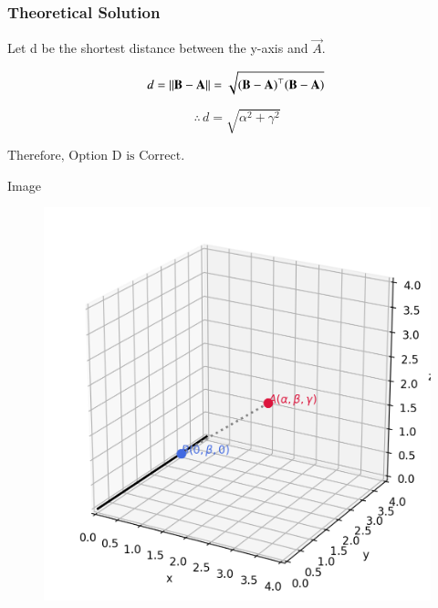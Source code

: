 \documentclass{beamer}
\begin{document}
\begin{frame}[fragile]
    \frametitle{Theoretical Solution}
Let d be the shortest distance between the y-axis and $\vec{A}$.

\begin{equation}
    d = \left\lVert\mathbf{B}-\mathbf{A}\right\rVert = \sqrt{\mathbf{(B-A)}^\top\mathbf{(B-A)}} \,  
\end{equation}

\begin{equation}
\therefore \, d = \sqrt{\alpha^2 + \gamma^2}    
\end{equation}

\begin{center}
$\boxed{\text{Therefore, Option D is Correct.}}$
\end{center}
\end{frame}

\begin{frame}{Image}
\begin{figure}
   \centering
    \includegraphics[width=\columnwidth, height=0.8\textheight, keepaspectratio]{figs/fig1.png}
    \label{fig:Beamer/figs/fig1.png}
\end{figure}
\end{frame}
\end{document}

